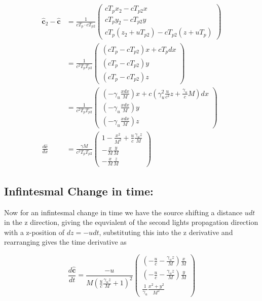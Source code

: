 \begin{equation}
	\begin{aligned}
	\mathbf{\hat{c}}_2 - \mathbf{\hat{c}} &= \frac{1}{c T_{p} \cdot c T_{p2}}
	\begin{pmatrix}
		c T_{p} x_2 - c T_{p2} x\\
		c T_{p} y_2 - c T_{p2} y\\
		c T_{p} (z_2 + u T_{p2}) - c T_{p2} (z + u T_{p})
	\end{pmatrix} \\
	&=
	\frac{1}{c^2 T_{p} T_{p2}}
	\begin{pmatrix}
		(c T_{p} - c T_{p2}) x + c T_{p} dx \\
		(c T_{p} - c T_{p2}) y \\
		(c T_{p} - c T_{p2}) z
	\end{pmatrix} \\
	&=
	\frac{1}{c^2 T_{p} T_{p2}}
	\begin{pmatrix}
		(- \gamma_u \frac{xdx}{M}) x + c (\gamma_u^2 \frac{u}{c^2}z + \frac{\gamma_u}{c} M) dx \\
		(- \gamma_u \frac{xdx}{M}) y \\
		(- \gamma_u \frac{xdx}{M}) z
	\end{pmatrix} \\
	\frac{d\mathbf{\hat{c}}}{dx} &=
	\frac{\gamma M}{c^2 T_{p} T_{p2}}
	\begin{pmatrix}
		1 - \frac{x^2}{M^2} + \frac{u}{c}\frac{\gamma_u z}{M} \\
		- \frac{x}{M} \frac{y}{M} \\
		- \frac{x}{M} \frac{z}{M}
	\end{pmatrix}
\end{aligned}
\end{equation}


\subsection{Infintesmal Change in time:}

Now for an infintesmal change in time we have the source shifting a distance $u dt$ in the z direction, giving the equvialent of the second lights propagation direction with a z-position of $ dz = - u dt$, substituting this into the z derivative and rearranging gives the time derivative as

\begin{equation}
	\frac{d\mathbf{\hat{c}}}{dt} = \frac{-u}{M (  \frac{u}{c} \frac{\gamma_u z}{M} +  1 )^2}
	\begin{pmatrix}
		( - \frac{u}{c}  - \frac{ \gamma_u z }{M} ) \frac{x}{M} \\
		( - \frac{u}{c}  - \frac{\gamma_u z }{M} ) \frac{y}{M} \\
		 \frac{1}{\gamma_u}\frac{ x^2 + y^2 }{M^2}
	\end{pmatrix}
\end{equation}